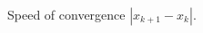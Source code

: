 \documentclass[12pt]{article}
\begin{document}
\begin{multicols}{2}
\begin{figure}[H]
\centering

\caption{
    Speed of convergence $|x_{k+1} - x_k|$.
}
\end{figure}


\end{multicols}
\end{document}
